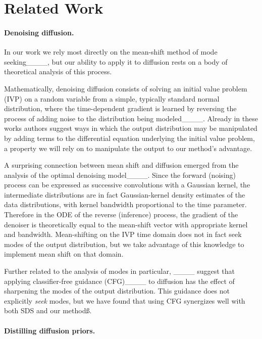 \section{Related Work}
\label{sec:related}

\paragraph{Denoising diffusion.}

In our work we rely most directly on the mean-shift method of mode seeking____, but our ability to apply it to diffusion rests on a body of theoretical analysis of this process.

Mathematically, denoising diffusion consists of solving an initial value problem (IVP) on a random variable from a simple, typically standard normal distribution, where the time-dependent gradient is learned by reversing the process of adding noise to the distribution being modeled____. Already in these works authors suggest ways in which the output distribution may be manipulated by adding terms to the differential equation underlying the initial value problem, a property we will rely on to manipulate the output to our method's advantage.

A surprising connection between mean shift and diffusion emerged from the analysis of the optimal denoising model____. Since the forward (noising) process can be expressed as successive convolutions with a Gaussian kernel, the intermediate distributions are in fact Gaussian-kernel density estimates of the data distributions, with kernel bandwidth proportional to the time parameter. Therefore in the ODE of the reverse (inference) process, the gradient of the denoiser is theoretically equal to the mean-shift vector with appropriate kernel and bandwidth. Mean-shifting on the IVP time domain does not in fact seek modes of the output distribution, but we take advantage of this knowledge to implement mean shift on that domain.

Further related to the analysis of modes in particular, ____ suggest that applying classifier-free guidance (CFG)____ to diffusion has the effect of sharpening the modes of the output distribution. This guidance does not explicitly \emph{seek} modes, but we have found that using CFG synergizes well with both SDS and our methodß.

\paragraph{Distilling diffusion priors.}

